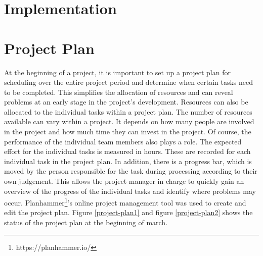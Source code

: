 \section{Implementation}
\label{sec:orgaa7b811}


\section{Project Plan}
\label{sec:org8452a3e}
At the beginning of a project, it is important to set up a project plan for scheduling over the entire project period and determine when certain tasks need to be completed. This simplifies the allocation of resources and can reveal problems at an early stage in the project's development. Resources can also be allocated to the individual tasks within a project plan. The number of resources available can vary within a project. It depends on how many people are involved in the project and how much time they can invest in the project. Of course, the performance of the individual team members also plays a role. The expected effort for the individual tasks is measured in hours. These are recorded for each individual task in the project plan. In addition, there is a progress bar, which is moved by the person responsible for the task during processing according to their own judgement. This allows the project manager in charge to quickly gain an overview of the progress of the individual tasks and identify where problems may occur. Planhammer\footnote{https://planhammer.io/}'s online project management tool was used to create and edit the project plan. Figure \ref{project-plan1} and figure \ref{project-plan2} shows the status of the project plan at the beginning of march.
